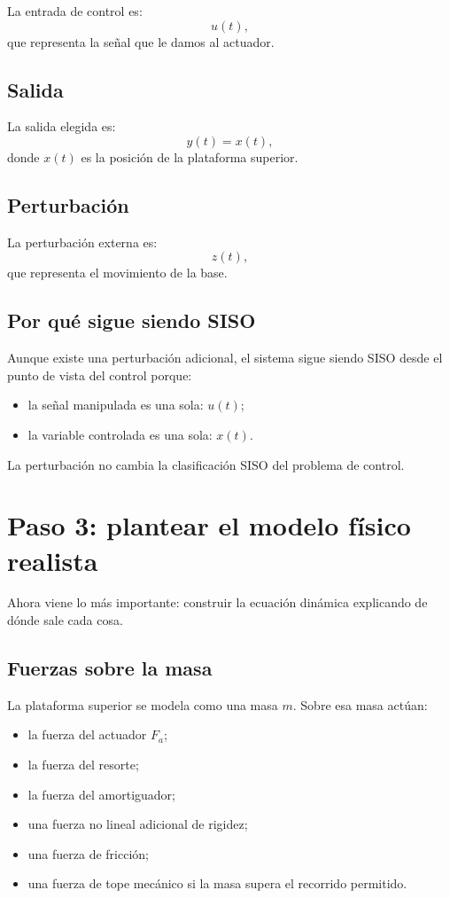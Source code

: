\documentclass[11pt]{article}
\begin{document}
La entrada de control es:
\[
u(t),
\]
que representa la se\~nal que le damos al actuador.

\subsection{Salida}

La salida elegida es:
\[
y(t)=x(t),
\]
donde $x(t)$ es la posici\'on de la plataforma superior.

\subsection{Perturbaci\'on}

La perturbaci\'on externa es:
\[
z(t),
\]
que representa el movimiento de la base.

\subsection{Por qu\'e sigue siendo SISO}

Aunque existe una perturbaci\'on adicional, el sistema sigue siendo SISO desde el punto de vista del control porque:

\begin{itemize}[leftmargin=1.2cm]
\item la se\~nal manipulada es una sola: $u(t)$;
\item la variable controlada es una sola: $x(t)$.
\end{itemize}

La perturbaci\'on no cambia la clasificaci\'on SISO del problema de control.

\section{Paso 3: plantear el modelo f\'isico realista}

Ahora viene lo m\'as importante: construir la ecuaci\'on din\'amica explicando de d\'onde sale cada cosa.

\subsection{Fuerzas sobre la masa}

La plataforma superior se modela como una masa $m$. Sobre esa masa act\'uan:

\begin{itemize}[leftmargin=1.2cm]
\item la fuerza del actuador $F_a$;
\item la fuerza del resorte;
\item la fuerza del amortiguador;
\item una fuerza no lineal adicional de rigidez;
\item una fuerza de fricci\'on;
\item una fuerza de tope mec\'anico si la masa supera el recorrido permitido.
\end{itemize}
\end{document}

